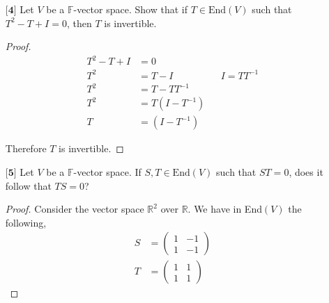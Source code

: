 \documentclass[12pt]{article}
\newcommand      {\Rm}         {{\mathbb R}}
\begin{document}
\begin{itemize}
    \vspace{.5cm}
    \item[$\textbf{[4]}$]
    Let $V$ be a $\mathbb{F}$-vector space. Show that if $T \in \text{End}(V)$ such that $T^2 - T + I = 0$, then $T$ is invertible. 
    \begin{proof}
        \begin{align*}
            T^2 - T + I &= 0 \\ 
            T^2 &= T-I && I = TT^{-1} \\
            T^2 &= T-TT^{-1} \\
            T^2 &= T(I - T^{-1}) \\
            T &= (I - T^{-1})
        \end{align*}

        Therefore $T$ is invertible. 
    \end{proof}
    \vspace{.5cm}
    \item[$\textbf{[5]}$]
    Let $V$ be a $\mathbb{F}$-vector space. If $S,T \in \text{End}(V)$ such that $ST = 0$, does it follow that $TS = 0$?
    \begin{proof}
        Consider the vector space $\Rm^2$ over $\Rm$. We have in End$(V)$ the following,
        \begin{align*}
            S &= \begin{pmatrix}
                1 & -1 \\ 1 & -1
            \end{pmatrix} \\
            T &= \begin{pmatrix}
                1 & 1 \\ 1 & 1
            \end{pmatrix}
        \end{align*}


\end{proof}
\end{itemize}
\end{document}
